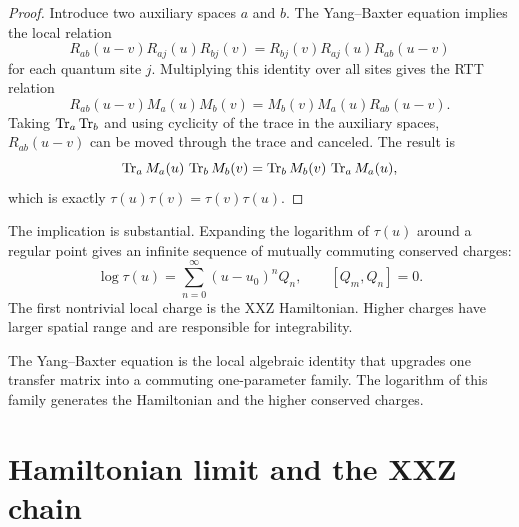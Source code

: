 \begin{proof}
Introduce two auxiliary spaces $a$ and $b$.  The Yang--Baxter equation implies
the local relation
\begin{equation}
\label{eq:six-vertex-local-RLL}
    R_{ab}(u-v)R_{aj}(u)R_{bj}(v)
    =
    R_{bj}(v)R_{aj}(u)R_{ab}(u-v)
\end{equation}
for each quantum site $j$.  Multiplying this identity over all sites gives the
RTT relation
\begin{equation}
\label{eq:six-vertex-RTT}
    R_{ab}(u-v)M_a(u)M_b(v)
    =
    M_b(v)M_a(u)R_{ab}(u-v) .
\end{equation}
Taking $\operatorname{Tr}_a\operatorname{Tr}_b$ and using cyclicity of the trace in the auxiliary spaces,
$R_{ab}(u-v)$ can be moved through the trace and canceled.  The result is
\begin{equation}
    \operatorname{Tr}_a M_a(u)\,\operatorname{Tr}_b M_b(v)
    =
    \operatorname{Tr}_b M_b(v)\,\operatorname{Tr}_a M_a(u),
\end{equation}
which is exactly $\tau(u)\tau(v)=\tau(v)\tau(u)$.
\end{proof}

The implication is substantial.  Expanding the logarithm of $\tau(u)$ around a
regular point gives an infinite sequence of mutually commuting conserved charges:
\begin{equation}
\label{eq:six-vertex-log-transfer-charges}
    \log\tau(u)
    =
    \sum_{n=0}^{\infty}(u-u_0)^n Q_n,
    \qquad
    [Q_m,Q_n]=0 .
\end{equation}
The first nontrivial local charge is the XXZ Hamiltonian.  Higher charges have
larger spatial range and are responsible for integrability.

\begin{principle}
The Yang--Baxter equation is the local algebraic identity that upgrades one
transfer matrix into a commuting one-parameter family.  The logarithm of this
family generates the Hamiltonian and the higher conserved charges.
\end{principle}

\section{Hamiltonian limit and the XXZ chain}
\label{sec:six-vertex-hamiltonian-limit}


